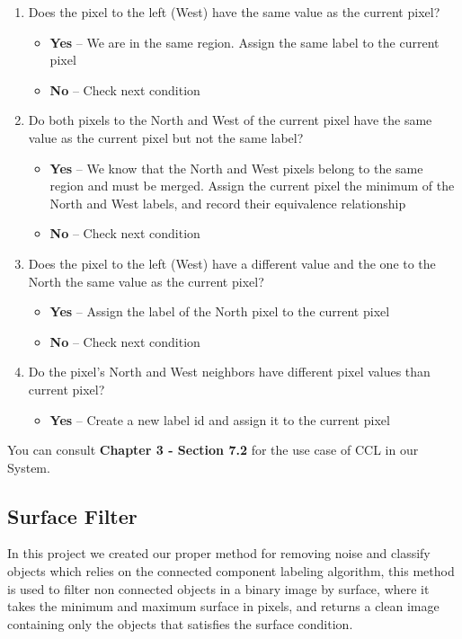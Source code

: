 \begin{enumerate}
    \item Does the pixel to the left (West) have the same value as the current pixel?
        \begin{itemize}
            \item \textbf{Yes} – We are in the same region. Assign the same label to the current pixel
            \item \textbf{No} – Check next condition
        \end{itemize}
    \item Do both pixels to the North and West of the current pixel have the same value as the current pixel but not the same label?
     \begin{itemize}
        \item \textbf{Yes} – We know that the North and West pixels belong to the same region and must be merged. Assign the current pixel the minimum of the North and West labels, and record their equivalence relationship
        \item \textbf{No} – Check next condition
    \end{itemize}   
    \item Does the pixel to the left (West) have a different value and the one to the North the same value as the current pixel?
     \begin{itemize}
        \item \textbf{Yes} – Assign the label of the North pixel to the current pixel
        \item \textbf{No} – Check next condition
    \end{itemize}
    \item Do the pixel's North and West neighbors have different pixel values than current pixel?
     \begin{itemize}
        \item \textbf{Yes} – Create a new label id and assign it to the current pixel
    \end{itemize}
\end{enumerate}

You can consult \textbf{Chapter 3 - Section 7.2} for the use case of CCL in our System.

\subsection{Surface Filter}
In this project we created our proper method for removing noise and classify objects which relies on the connected component labeling algorithm, this method is used to filter non connected objects in a binary image by surface, where it takes the minimum and maximum surface in pixels, and returns a clean image containing only the objects that satisfies the surface condition.

